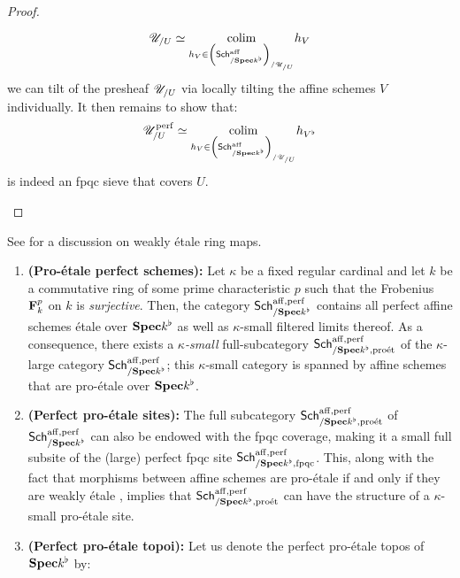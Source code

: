 \begin{proof}
\begin{enumerate}
                                $$\mathscr{U}_{/U} \simeq \underset{ h_V \in \left( \mathsf{Sch}^{\mathrm{aff}}_{/\mathbf{Spec} k^{\flat}} \right)_{/\mathscr{U}_{/U}} }{\operatorname{colim}} h_V$$
                            we can tilt of the presheaf $\mathscr{U}_{/U}$ via locally tilting the affine schemes $V$ individually. It then remains to show that:
                                $$\mathscr{U}_{/U}^{\mathrm{perf}} \simeq \underset{ h_V \in \left( \mathsf{Sch}^{\mathrm{aff}}_{/\mathbf{Spec} k^{\flat}} \right)_{/\mathscr{U}_{/U}} }{\operatorname{colim}} h_{V^{\flat}}$$
                            is indeed an fpqc sieve that covers $U$. 
                        \end{enumerate}
                    \end{proof}
                
                \begin{proposition} \label{prop: perfect_pro_etale_sites}
                    See \cite[\href{https://stacks.math.columbia.edu/tag/094N}{Tag 094N}]{stacks} for a discussion on weakly \'etale ring maps.
                    \begin{enumerate}
                        \item \textbf{(Pro-\'etale perfect schemes):} Let $\kappa$ be a fixed regular cardinal and let $k$ be a commutative ring of some prime characteristic $p$ such that the Frobenius $\mathbf{F}^p_k$ on $k$ is \textit{surjective}. Then, the category $\mathsf{Sch}^{\mathrm{aff}, \mathrm{perf}}_{/\mathbf{Spec} k^{\flat}}$ contains all perfect affine schemes \'etale over $\mathbf{Spec} k^{\flat}$ as well as $\kappa$-small filtered limits thereof. As a consequence, there exists a \textit{$\kappa$-small} full-subcategory $\mathsf{Sch}^{\mathrm{aff}, \mathrm{perf}}_{/\mathbf{Spec} k^{\flat}, \mathrm{pro\acute{e}t}}$ of the $\kappa$-large category $\mathsf{Sch}^{\mathrm{aff}, \mathrm{perf}}_{/\mathbf{Spec} k^{\flat}}$; this $\kappa$-small category is spanned by affine schemes that are pro-\'etale over $\mathbf{Spec} k^{\flat}$.
                        \item \textbf{(Perfect pro-\'etale sites):} The full subcategory $\mathsf{Sch}^{\mathrm{aff}, \mathrm{perf}}_{/\mathbf{Spec} k^{\flat}, \mathrm{pro\acute{e}t}}$ of $\mathsf{Sch}^{\mathrm{aff}, \mathrm{perf}}_{/\mathbf{Spec} k^{\flat}}$ can also be endowed with the fpqc coverage, making it a small full subsite of the (large) perfect fpqc site $\mathsf{Sch}^{\mathrm{aff}, \mathrm{perf}}_{/\mathbf{Spec} k^{\flat}, \mathrm{fpqc}}$. This, along with the fact that morphisms between affine schemes are pro-\'etale if and only if they are weakly \'etale \cite[Theorem 1.3]{bhatt_scholze_2014_pro_etale}, implies that $\mathsf{Sch}^{\mathrm{aff}, \mathrm{perf}}_{/\mathbf{Spec} k^{\flat}, \mathrm{pro\acute{e}t}}$ can have the structure of a $\kappa$-small pro-\'etale site.
                        \item \textbf{(Perfect pro-\'etale topoi):} Let us denote the perfect pro-\'etale topos of $\mathbf{Spec} k^{\flat}$ by:

\end{enumerate}
\end{proposition}
